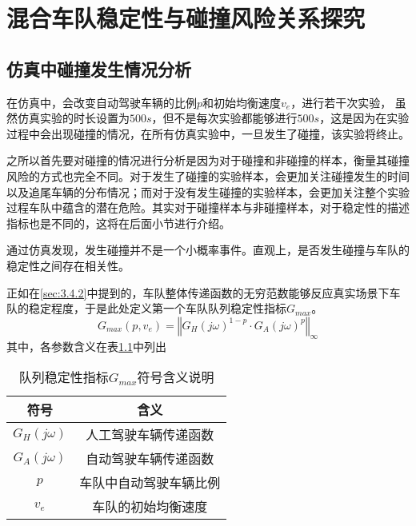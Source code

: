 
\chapter{混合车队稳定性与碰撞风险关系探究}

\section{仿真中碰撞发生情况分析}

在仿真中，会改变自动驾驶车辆的比例$p$和初始均衡速度$v_e$，进行若干次实验， 虽然仿真实验的时长设置为$500s$，但不是每次实验都能够进行$500s$，这是因为在实验过程中会出现碰撞的情况，在所有仿真实验中，一旦发生了碰撞，该实验将终止。

之所以首先要对碰撞的情况进行分析是因为对于碰撞和非碰撞的样本，衡量其碰撞风险的方式也完全不同。对于发生了碰撞的实验样本，会更加关注碰撞发生的时间以及追尾车辆的分布情况；而对于没有发生碰撞的实验样本，会更加关注整个实验过程车队中蕴含的潜在危险。其实对于碰撞样本与非碰撞样本，对于稳定性的描述指标也是不同的，这将在后面小节进行介绍。

通过仿真发现，发生碰撞并不是一个小概率事件。直观上，是否发生碰撞与车队的稳定性之间存在相关性。

正如在\ref{sec:3.4.2}中提到的，车队整体传递函数的无穷范数能够反应真实场景下车队的稳定程度，于是此处定义第一个车队队列稳定性指标$G_{max}$。
\begin{equation}
    G_{max}(p, v_e) = \left\Vert G_H(j\omega)^{1-p} \cdot G_A(j\omega)^p \right\Vert_{\infty}
    \label{eq:chap04-1}
\end{equation}
其中，各参数含义在表\ref{tab:chap04-1}中列出

\begin{table}
    \centering
    \caption{队列稳定性指标$G_{max}$符号含义说明}
    \begin{tabular}{cc}
      \toprule
      符号          &  含义                         \\
      \midrule
      $G_H(j\omega)$    & 人工驾驶车辆传递函数        \\
      $G_A(j\omega)$    & 自动驾驶车辆传递函数         \\
      $p$               & 车队中自动驾驶车辆比例       \\
      $v_e$             & 车队的初始均衡速度          \\
      \bottomrule
    \end{tabular}
    \label{tab:chap04-1}
  \end{table}


